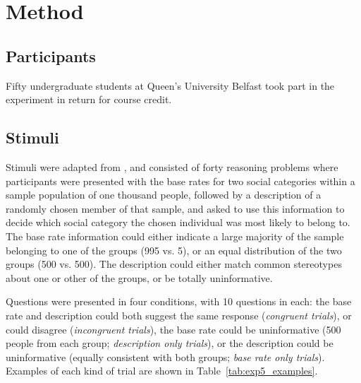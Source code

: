 
\section{Method}\label{method}

\subsection{Participants}\label{participants}

Fifty undergraduate students at Queen's University Belfast
took part in the experiment in return for course credit.

\subsection{Stimuli}\label{stimuli}

Stimuli were adapted from \citet{DeNeys2008a},
and consisted of forty reasoning problems
where participants were presented with the base rates
for two social categories within a sample population of one thousand people,
followed by a description of a randomly chosen member of that sample,
and asked to use this information to decide which social category
the chosen individual was most likely to belong to.
The base rate information could either indicate a large majority
of the sample belonging to one of the groups (995 vs. 5),
or an equal distribution of the two groups (500 vs. 500).
The description could either match common stereotypes about
one or other of the groups, or be totally uninformative.

Questions were presented in four conditions, with 10 questions in each:
the base rate and description could
both suggest the same response (\emph{congruent trials}),
or could disagree (\emph{incongruent trials}),
the base rate could be uninformative
(500 people from each group; \emph{description only trials}),
or the description could be uninformative
(equally consistent with both groups; \emph{base rate only trials}).
Examples of each kind of trial are shown in Table~\ref{tab:exp5_examples}.


